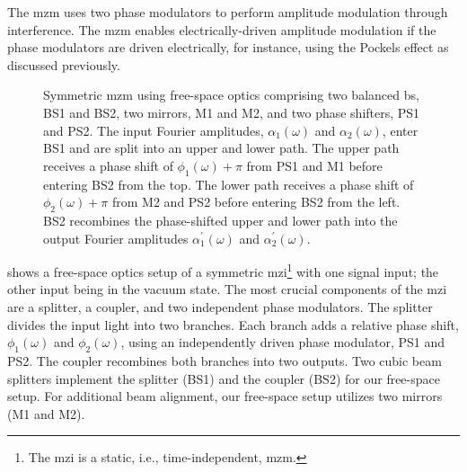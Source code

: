 The \gls{mzm} uses two phase modulators to perform amplitude modulation through interference.
The \gls{mzm} enables electrically-driven amplitude modulation if the phase modulators are driven electrically, for instance, using the Pockels effect as discussed previously.
\begin{figure}[htb]
	\centering
	
	\caption{Symmetric \gls{mzm} using free-space optics comprising two balanced \gls{bs}, BS1 and BS2, two mirrors, M1 and M2, and two phase shifters, PS1 and PS2. The input Fourier amplitudes, $\alpha_1(\omega)$ and $\alpha_2(\omega)$, enter BS1 and are split into an upper and lower path. The upper path receives a phase shift of $\phi_1(\omega)+\pi$ from PS1 and M1 before entering BS2 from the top. The lower path receives a phase shift of $\phi_2(\omega)+\pi$ from M2 and PS2 before entering BS2 from the left. BS2 recombines the phase-shifted upper and lower path into the output Fourier amplitudes $\alpha_1^\prime(\omega)$ and $\alpha_2^\prime(\omega)$.}\label{fig:mzi_symmetric}
\end{figure}
 shows a free-space optics setup of a symmetric \gls{mzi}\footnote{The \gls{mzi} is a static, i.e., time-independent, \gls{mzm}.} with one signal input; the other input being in the vacuum state.
The most crucial components of the \gls{mzi} are a splitter, a coupler, and two independent phase modulators.
The splitter divides the input light into two branches.
Each branch adds a relative phase shift, $\phi_1(\omega)$ and $\phi_2(\omega)$, using an independently  driven phase modulator, PS1 and PS2.
The coupler recombines both branches into two outputs.
Two cubic beam splitters implement the splitter (BS1) and the coupler (BS2) for our free-space setup.
For additional beam alignment, our free-space setup utilizes two mirrors (M1 and M2).

